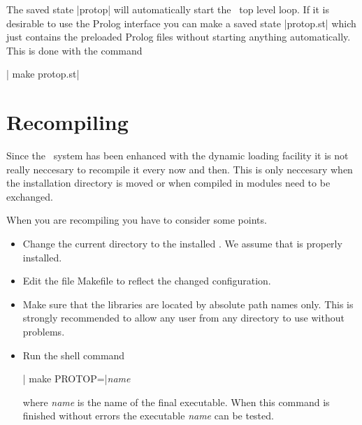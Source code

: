 The saved state |protop| will automatically start the \ProTop\ top level
loop.  If it is desirable to use the Prolog interface you can make a saved
state |protop.st| which just contains the preloaded Prolog files without
starting anything automatically. This is done with the command

|  make protop.st|



\section{Recompiling \ProTop}\label{sec:recompile}

Since the \ProTop\ system has been enhanced with the dynamic loading facility
it is not really neccesary to recompile it every now and then. This is only
neccesary when the installation directory is moved or when compiled in modules
need to be exchanged.

When you are recompiling \ProCom{} you have to consider some points.

\begin{itemize}
  \item Change the current directory to the installed \ProCom.
	We assume that \ProCom{} is properly installed.
  \item Edit the file {\sf Makefile}\/ to reflect the changed configuration.
  \item Make sure that the libraries are located by absolute path names only.
	This is strongly recommended to allow any user from any directory to
	use \ProCom{} without problems.
  \item Run the shell command

	|  make PROTOP=|{\em name}

	where {\em name}\/ is the name of the final executable. When this
	command is finished without errors the executable {\em name}\/ can be
	tested.
\end{itemize}

